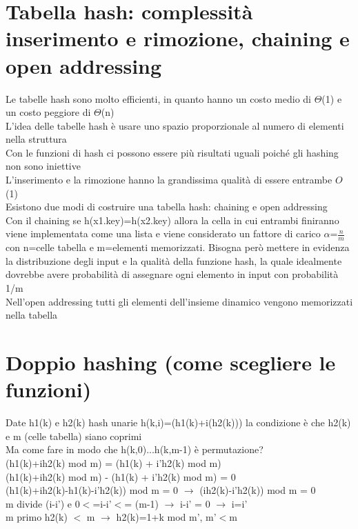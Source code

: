 \documentclass[12pt,oneside,a4paper]{article}
\newcommand\Omicron{O}
\begin{document}
\section{Tabella hash: complessità inserimento e rimozione, chaining e open addressing}
Le tabelle hash sono molto efficienti, in quanto hanno un costo medio di $\Theta$(1) e un costo peggiore di $\Theta$(n)\\
L'idea delle tabelle hash è usare uno spazio proporzionale al numero di elementi nella struttura\\
Con le funzioni di hash ci possono essere più risultati uguali poiché gli hashing non sono iniettive\\
L'inserimento e la rimozione hanno la grandissima qualità di essere entrambe $\Omicron$(1)\\
Esistono due modi di costruire una tabella hash: chaining e open addressing\\
Con il chaining se h(x1.key)=h(x2.key) allora la cella in cui entrambi finiranno viene implementata come una lista e viene considerato un fattore di carico $\alpha$=$\frac{n}{m}$ con n=celle tabella e m=elementi memorizzati. Bisogna però mettere in evidenza la distribuzione degli input e la qualità della funzione hash, la quale idealmente dovrebbe avere probabilità di assegnare ogni elemento in input con probabilità 1/m\\
Nell'open addressing tutti gli elementi dell'insieme dinamico vengono memorizzati nella tabella
\section{Doppio hashing (come scegliere le funzioni)}
Date h1(k) e h2(k) hash unarie h(k,i)=(h1(k)+i(h2(k))) la condizione è che h2(k) e m (celle tabella) siano coprimi \\
Ma come fare in modo che h(k,0)...h(k,m-1) è permutazione?\\
(h1(k)+ih2(k) mod m) = (h1(k) + i'h2(k) mod m)\\
(h1(k)+ih2(k) mod m) - (h1(k) + i'h2(k) mod m) = 0\\
(h1(k)+ih2(k)-h1(k)-i'h2(k)) mod m = 0 $\to$ (ih2(k)-i'h2(k)) mod m = 0\\
m divide (i-i') e 0$<$=i-i'$<$= (m-1) $\to$ i-i' = 0 $\to$ i=i'\\
m primo h2(k) $<$ m $\to$ h2(k)=1+k mod m', m'$<$m
\end{document}
